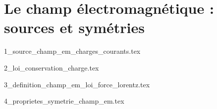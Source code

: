 \chapter{Le champ électromagnétique : sources et symétries}

\minitoc

{1_source_champ_em_charges_courants.tex}

{2_loi_conservation_charge.tex}

{3_definition_champ_em_loi_force_lorentz.tex}

{4_proprietes_symetrie_champ_em.tex}